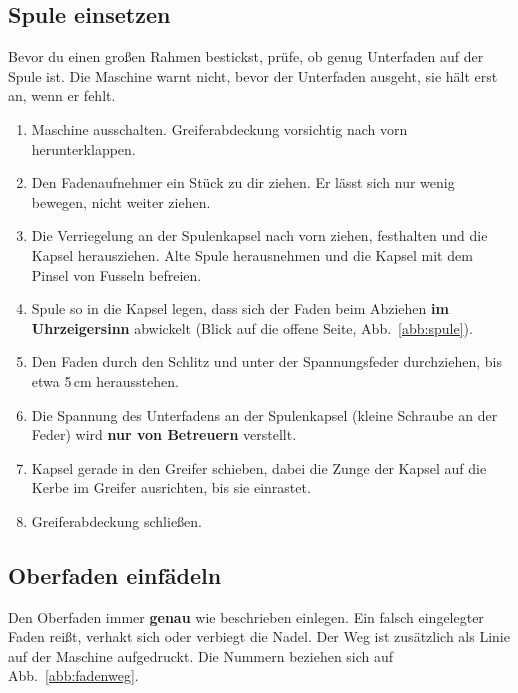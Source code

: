 \documentclass{\basedir/fablab-document}
\begin{document}
	\subsection{Spule einsetzen}
	\label{sec:spule}
	Bevor du einen großen Rahmen bestickst, prüfe, ob genug Unterfaden auf der Spule ist. Die Maschine warnt nicht, bevor der Unterfaden ausgeht, sie hält erst an, wenn er fehlt.
	\begin{enumerate}
		\item Maschine ausschalten. Greiferabdeckung vorsichtig nach vorn herunterklappen.
		\item Den Fadenaufnehmer ein Stück zu dir ziehen. Er lässt sich nur wenig bewegen, nicht weiter ziehen.
		\item Die Verriegelung an der Spulenkapsel nach vorn ziehen, festhalten und die Kapsel herausziehen. Alte Spule herausnehmen und die Kapsel mit dem Pinsel von Fusseln befreien.
		\item Spule so in die Kapsel legen, dass sich der Faden beim Abziehen \textbf{im Uhrzeigersinn} abwickelt (Blick auf die offene Seite, Abb.~\ref{abb:spule}).
		\item Den Faden durch den Schlitz und unter der Spannungsfeder durchziehen, bis etwa 5\,cm herausstehen.
		\item Die Spannung des Unterfadens an der Spulenkapsel (kleine Schraube an der Feder) wird \textbf{nur von Betreuern} verstellt.
		\item Kapsel gerade in den Greifer schieben, dabei die Zunge der Kapsel auf die Kerbe im Greifer ausrichten, bis sie einrastet.
		\item Greiferabdeckung schließen.
	\end{enumerate}

	\begin{center}
		
		\label{abb:spule}
	\end{center}

	\subsection{Oberfaden einfädeln}
	Den Oberfaden immer \textbf{genau} wie beschrieben einlegen. Ein falsch eingelegter Faden reißt, verhakt sich oder verbiegt die Nadel. Der Weg ist zusätzlich als Linie auf der Maschine aufgedruckt. Die Nummern beziehen sich auf Abb.~\ref{abb:fadenweg}.
\end{document}
